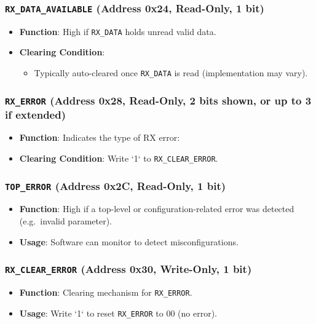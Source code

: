 \subsubsection{\texttt{RX\_DATA\_AVAILABLE} (Address 0x24, Read-Only, 1 bit)}
\begin{itemize}[noitemsep]
\item \textbf{Function}: High if \texttt{RX\_DATA} holds unread valid data.
\item \textbf{Clearing Condition}:
  \begin{itemize}[noitemsep]
  \item Typically auto-cleared once \texttt{RX\_DATA} is read (implementation may vary).
  \end{itemize}
\end{itemize}

\subsubsection{\texttt{RX\_ERROR} (Address 0x28, Read-Only, 2 bits shown, or up to 3 if extended)}
\begin{itemize}[noitemsep]
\item \textbf{Function}: Indicates the type of RX error:
\item \textbf{Clearing Condition}: Write `1` to \texttt{RX\_CLEAR\_ERROR}.
\end{itemize}

\subsubsection{\texttt{TOP\_ERROR} (Address 0x2C, Read-Only, 1 bit)}
\begin{itemize}[noitemsep]
\item \textbf{Function}: High if a top-level or configuration-related error was detected (e.g.\ invalid parameter).
\item \textbf{Usage}: Software can monitor to detect misconfigurations.
\end{itemize}

\subsubsection{\texttt{RX\_CLEAR\_ERROR} (Address 0x30, Write-Only, 1 bit)}
\begin{itemize}[noitemsep]
\item \textbf{Function}: Clearing mechanism for \texttt{RX\_ERROR}.
\item \textbf{Usage}: Write `1` to reset \texttt{RX\_ERROR} to 00 (no error).
\end{itemize}

